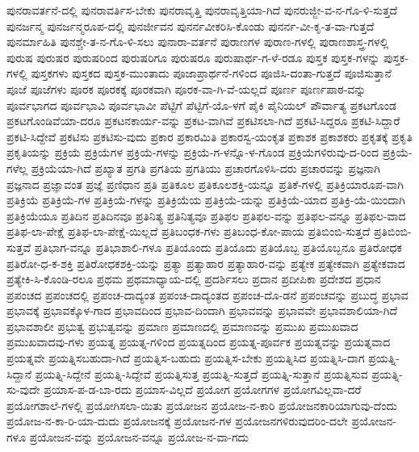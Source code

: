 {ಪುನರಾವರ್ತನೆ-ದಲ್ಲಿ
ಪುನರಾವರ್ತಿಸ-ಬೇಕು
ಪುನರಾವೃತ್ತಿ
ಪುನರಾವೃತ್ತಿಯಾ-ಗಿದೆ
ಪುನರುಜ್ಜೀ-ವ-ನ-ಗೊ-ಳಿ-ಸುತ್ತದೆ
ಪುನರ್ಜನ್ಮ
ಪುನರ್ಜನ್ಮರೂಪ-ದಲ್ಲಿ
ಪುನರ್ಜೀವನ
ಪುನರ್ನವೀಕರಿಸಿ-ಕೊಂಡು
ಪುನರ್ನ-ವೀ-ಕೃ-ತ-ವಾ-ಗುತ್ತದೆ
ಪುನರ್ಮಾಹಿತಿ
ಪುನಶ್ಚೇ-ತ-ನ-ಗೊ-ಳಿ-ಸಲು
ಪುನಾರಾ-ವರ್ತನೆ
ಪುರಾಣಗಳ
ಪುರಾಣ-ಗಳಲ್ಲಿ
ಪುರಾಣಶಾಸ್ತ್ರ-ಗಳಲ್ಲಿ
ಪುರುಷ
ಪುರುಷರ
ಪುರುಷರಿಂದ
ಪುರುಷರಿಗೂ
ಪುರುಷರೂ
ಪುರುಷಾರ್ಥ-ಗ-ಳೆ-ರಡೂ
ಪುಸ್ತಕ
ಪುಸ್ತಕ-ಗಳನ್ನು
ಪುಸ್ತಕ-ಗಳಲ್ಲಿ
ಪುಸ್ತಕಗಳು
ಪುಸ್ತಕದ
ಪುಸ್ತಕ-ಮುಂತಾದು
ಪೂಜಾಪ್ರಾರ್ಥನೆ-ಗಳಿಂದ
ಪೂಜಿಸಿ-ದಂತಾ-ಗುತ್ತದೆ
ಪೂಜಿಸುತ್ತಾನೆ
ಪೂಜೆ
ಪೂಜೆಗಳು
ಪೂರಕ
ಪೂರಕಕ್ಕೆ
ಪೂರಕವಾಗಿ
ಪೂರಕ-ವಾ-ಗಿ-ವೆ-ಯಲ್ಲದೆ
ಪೂರ್ಣ
ಪೂರ್ಣಪಾಠ-ವನ್ನು
ಪೂರ್ವಭಾಗದ
ಪೂರ್ವಭಾವಿ
ಪೂರ್ವಭಾವೀ
ಪೆಟ್ಟಿಗೆ
ಪೆಟ್ಟಿಗೆ-ಯೊ-ಳಗೆ
ಪೈಕಿ
ಪೈನಿಯಲ್
ಪೌರ್ವಾತ್ಯ
ಪ್ರಕಟಗೊಂಡ
ಪ್ರಕಟಗೊಂಡಿವೆಯಾ-ದರೂ
ಪ್ರಕಟನಕಾರ್ಯ-ವನ್ನು
ಪ್ರಕಟ-ವಾಗಿವೆ
ಪ್ರಕಟಿಸಲಾ-ಗಿದೆ
ಪ್ರಕಟಿ-ಸಿದ್ದರೂ
ಪ್ರಕಟಿ-ಸಿದ್ದಾರೆ
ಪ್ರಕಟಿ-ಸಿದ್ದೇವೆ
ಪ್ರಕಟಿಸು
ಪ್ರಕಟಿಸು-ವುದು
ಪ್ರಕಾರ
ಪ್ರಕಾರಮಿತಿ
ಪ್ರಕಾರಸ್ವ-ಯಂಕೃತ
ಪ್ರಕಾಶಕ
ಪ್ರಕಾಶಕರು
ಪ್ರಕೃತಕ್ಕೆ
ಪ್ರಕೃತಿ
ಪ್ರಕೃತಿಯನ್ನು
ಪ್ರಕ್ರಿಯೆ
ಪ್ರಕ್ರಿಯೆಗಳ
ಪ್ರಕ್ರಿಯೆ-ಗಳನ್ನು
ಪ್ರಕ್ರಿಯೆ-ಗ-ಳನ್ನೊ-ಳ-ಗೊಂಡ
ಪ್ರಕ್ರಿಯೆಗಳಿರುವು-ದ-ರಿಂದ
ಪ್ರಕ್ರಿಯೆ-ಗಳೆಲ್ಲ
ಪ್ರಕ್ರಿಯೆಯಾ-ಗಿದೆ
ಪ್ರಖ್ಯಾತ
ಪ್ರಗತಿ
ಪ್ರಗತಿಯ
ಪ್ರಗತಿಯು
ಪ್ರಚಾರಗೊಳಿಸಿ-ದರು
ಪ್ರಚಾರವನ್ನು
ಪ್ರಜ್ಞನಾಗಿ
ಪ್ರಜ್ಞನಾದ
ಪ್ರಜ್ಞಾವಂತ
ಪ್ರಜ್ಞೆ
ಪ್ರಣಿಧಾನ
ಪ್ರತಿ
ಪ್ರತಿಕೂಲ
ಪ್ರತಿಕೂಲಶಕ್ತಿ-ಯನ್ನೂ
ಪ್ರತಿಕೆ-ಗಳಲ್ಲಿ
ಪ್ರತಿಕ್ರಿಯಾರೂಪ-ವಾಗಿ
ಪ್ರತಿಕ್ರಿಯೆ
ಪ್ರತಿಕ್ರಿಯೆ-ಗಳ
ಪ್ರತಿಕ್ರಿಯೆ-ಗಳನ್ನು
ಪ್ರತಿಕ್ರಿಯೆಯ
ಪ್ರತಿಕ್ರಿಯೆ-ಯನ್ನು
ಪ್ರತಿಕ್ರಿಯೆ-ಯಾದ
ಪ್ರತಿಕ್ರಿ-ಯೆ-ಯಿಂದಾಗಿ
ಪ್ರತಿಕ್ರಿಯೆಯೂ
ಪ್ರತಿದಿನ
ಪ್ರತಿದಿನವೂ
ಪ್ರತಿನಿತ್ಯ
ಪ್ರತಿನಿತ್ಯವೂ
ಪ್ರತಿಫಲ
ಪ್ರತಿಫಲ-ವನ್ನು
ಪ್ರತಿಫಲ-ವನ್ನೂ
ಪ್ರತಿಫಲ-ವಾದ
ಪ್ರತಿಫ-ಲಾ-ಪೇಕ್ಷೆ
ಪ್ರತಿಫ-ಲಾ-ಪೇಕ್ಷೆ-ಯಿಲ್ಲದೆ
ಪ್ರತಿಬಂಧಕ-ಗಳು
ಪ್ರತಿಬಂಧ-ಕೋ-ಪಾಯ
ಪ್ರತಿಬಿಂಬಿ-ಸುತ್ತದೆ
ಪ್ರತಿಬಿಂಬಿ-ಸುತ್ತವೆ
ಪ್ರತಿಭಾಗ-ವನ್ನೂ
ಪ್ರತಿಭಾಶಾಲಿ-ಗಳೂ
ಪ್ರತಿಯೊಂದು
ಪ್ರತಿಯೊದು
ಪ್ರತಿಯೊಬ್ಬ
ಪ್ರತಿಯೊಬ್ಬನೂ
ಪ್ರತಿರೋಧಕ
ಪ್ರತಿರೋ-ಧ-ಕ-ಶಕ್ತಿ
ಪ್ರತಿರೋಧಕಶಕ್ತಿ-ಯನ್ನು
ಪ್ರತ್ಯಾ
ಪ್ರತ್ಯಾಹಾರ
ಪ್ರತ್ಯಾಹಾರ-ವನ್ನು
ಪ್ರತ್ಯೇಕ
ಪ್ರತ್ಯೇಕವಾಗಿ
ಪ್ರತ್ಯೇಕವಾದ
ಪ್ರತ್ಯೇಕಿ-ಸಿ-ಕೊಂಡಿ-ರಲೂ
ಪ್ರಥಮ
ಪ್ರಥಮಾಧ್ಯಾಯ-ದಲ್ಲಿ
ಪ್ರದರ್ಶಿಸಲು
ಪ್ರದಾನ
ಪ್ರದೀಪಿಕಾ
ಪ್ರದೇಶದ
ಪ್ರಧಾನ
ಪ್ರಪಂಚದ
ಪ್ರಪಂಚದಲ್ಲಿ
ಪ್ರಪಂಚ-ದಾದ್ಯಂತ
ಪ್ರಪಂಚ-ದಾದ್ಯಂತದ
ಪ್ರಪಂಚ-ದೊ-ಡನೆ
ಪ್ರಪಂಚವನ್ನು
ಪ್ರಬುದ್ಧ
ಪ್ರಭಾವ
ಪ್ರಭಾವಕ್ಕೆ
ಪ್ರಭಾವಕ್ಕೊಳ-ಗಾದ
ಪ್ರಭಾವದಿಂದ
ಪ್ರಭಾವ-ದಿಂದಾಗಿ
ಪ್ರಭಾವವನ್ನು
ಪ್ರಭಾವವೇ
ಪ್ರಭಾವಶಾಲಿಯಾ-ಗಿದೆ
ಪ್ರಭಾವಶಾಲೀ
ಪ್ರಭುತ್ವ
ಪ್ರಭುತ್ವವನ್ನು
ಪ್ರಮಾಣ
ಪ್ರಮಾಣದಲ್ಲಿ
ಪ್ರಮಾಣವನ್ನು
ಪ್ರಮುಖ
ಪ್ರಮುಖವಾದ
ಪ್ರಮುಖವಾದವು-ಗಳು
ಪ್ರಯತ್ನ
ಪ್ರಯತ್ನ-ಗಳಿಂದ
ಪ್ರಯತ್ನದಿಂದ
ಪ್ರಯತ್ನ-ಪೂರ್ವಕ
ಪ್ರಯತ್ನವನ್ನು
ಪ್ರಯತ್ನವಾದ
ಪ್ರಯತ್ನವೇ
ಪ್ರಯತ್ನಿಸಬಹುದಾ-ಗಿದೆ
ಪ್ರಯತ್ನಿಸ-ಬಹುದು
ಪ್ರಯತ್ನಿಸ-ಬೇಕು
ಪ್ರಯತ್ನಿಸಿದ
ಪ್ರಯತ್ನಿಸಿ-ದಾಗ
ಪ್ರಯತ್ನಿ-ಸಿದ್ದಾನೆ
ಪ್ರಯತ್ನಿ-ಸಿದ್ದೇನೆ
ಪ್ರಯತ್ನಿ-ಸಿದ್ದೇವೆ
ಪ್ರಯತ್ನಿಸುತ್ತ
ಪ್ರಯತ್ನಿ-ಸುತ್ತದೆ
ಪ್ರಯತ್ನಿ-ಸುತ್ತಾನೆ
ಪ್ರಯತ್ನಿಸುವ
ಪ್ರಯತ್ನಿ-ಸು-ವುದೇ
ಪ್ರಯಾಸ-ಪ-ಡ-ಬಾ-ರದು
ಪ್ರಯಾಸ-ವಿಲ್ಲದೆ
ಪ್ರಯೋಗ
ಪ್ರಯೋಗಗಳ
ಪ್ರಯೋಗವಿಲ್ಲವಾ-ದರೆ
ಪ್ರಯೋಗಶಾಲೆ-ಗಳಲ್ಲಿ
ಪ್ರಯೋಗಿಸಲಾ-ಯಿತು
ಪ್ರಯೋಜನ
ಪ್ರಯೋಜ-ನ-ಕಾರಿ
ಪ್ರಯೋಜನಕಾರಿಯಾಗುವು-ದೆಂದು
ಪ್ರಯೋಜ-ನ-ಕಾ-ರಿ-ಯಾ-ದುದು
ಪ್ರಯೋಜನಕ್ಕೆ
ಪ್ರಯೋಜನ-ಗಳ
ಪ್ರಯೋಜನಗಳಿರುವುದರಿಂ-ದಲೇ
ಪ್ರಯೋಜನ-ಗಳೂ
ಪ್ರಯೋಜನ-ವನ್ನು
ಪ್ರಯೋಜನ-ವನ್ನೂ
ಪ್ರಯೋಜ-ನ-ವಾ-ಗದು
}
